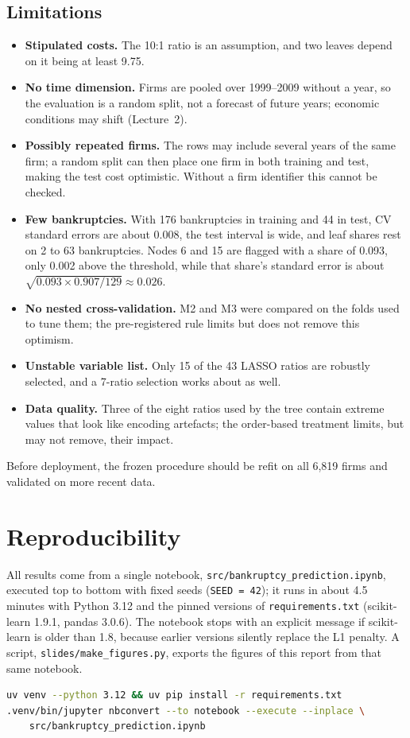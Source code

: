 \documentclass[11pt,a4paper]{article}
\begin{document}
\subsection{Limitations}
\begin{itemize}
  \item \textbf{Stipulated costs.} The 10:1 ratio is an assumption, and two leaves depend on it being at least 9.75.
  \item \textbf{No time dimension.} Firms are pooled over 1999–2009 without a year, so the evaluation is a random split, not a forecast of future years; economic conditions may shift (Lecture~2).
  \item \textbf{Possibly repeated firms.} The rows may include several years of the same firm; a random split can then place one firm in both training and test, making the test cost optimistic. Without a firm identifier this cannot be checked.
  \item \textbf{Few bankruptcies.} With 176 bankruptcies in training and 44 in test, CV standard errors are about 0.008, the test interval is wide, and leaf shares rest on 2 to 63 bankruptcies. Nodes 6 and 15 are flagged with a share of 0.093, only 0.002 above the threshold, while that share's standard error is about $\sqrt{0.093 \times 0.907 / 129} \approx 0.026$.
  \item \textbf{No nested cross-validation.} M2 and M3 were compared on the folds used to tune them; the pre-registered rule limits but does not remove this optimism.
  \item \textbf{Unstable variable list.} Only 15 of the 43 LASSO ratios are robustly selected, and a 7-ratio selection works about as well.
  \item \textbf{Data quality.} Three of the eight ratios used by the tree contain extreme values that look like encoding artefacts; the order-based treatment limits, but may not remove, their impact.
\end{itemize}
Before deployment, the frozen procedure should be refit on all 6,819 firms and validated on more recent data.

\section{Reproducibility}
All results come from a single notebook, \texttt{src/bankruptcy\_prediction.ipynb}, executed top to bottom with fixed seeds (\texttt{SEED = 42}); it runs in about 4.5 minutes with Python 3.12 and the pinned versions of \texttt{requirements.txt} (scikit-learn 1.9.1, pandas 3.0.6). The notebook stops with an explicit message if scikit-learn is older than 1.8, because earlier versions silently replace the L1 penalty. A script, \texttt{slides/make\_figures.py}, exports the figures of this report from that same notebook.
\begin{lstlisting}[language=bash, aboveskip=4pt]
uv venv --python 3.12 && uv pip install -r requirements.txt
.venv/bin/jupyter nbconvert --to notebook --execute --inplace \
    src/bankruptcy_prediction.ipynb
\end{lstlisting}
\end{document}
